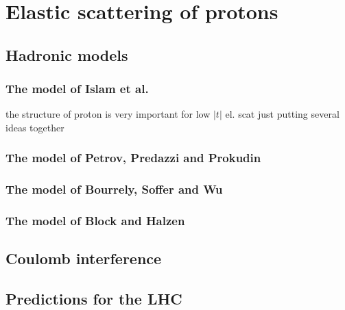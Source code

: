 \chapter{Elastic scattering of protons}

\section{Hadronic models}

\subsection{The model of Islam et al.}


\> the structure of proton is very important for low $|t|$ el. scat
\> just putting several ideas together

\subsection{The model of Petrov, Predazzi and Prokudin}


\subsection{The model of Bourrely, Soffer and Wu}


\subsection{The model of Block and Halzen}


\section{Coulomb interference}

\section{Predictions for the LHC}


